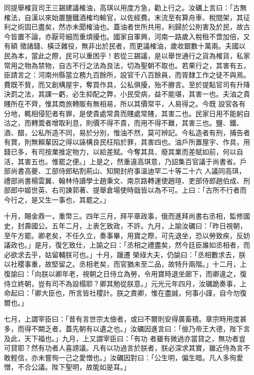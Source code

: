 \begin{pinyinscope}
 同提舉榷貨司王三錫建議榷油，高琪以用度方急，勸上行之。汝礪上言曰：「古無榷法，自漢以來始置鹽鐵酒榷均輸官，以佐經費。末流至有算舟車、稅間架，其征利之術固已盡矣，然亦未聞榷油也。蓋油者世所共用，利歸於公則害及於民，故古今皆置不論，亦厭苛細而重煩擾也。國家自軍興，河南一路歲入稅租不啻加倍，又有額
 徵諸錢、橫泛雜役，無非出於民者，而更議榷油，歲收銀數十萬兩。夫國以民為本，當此之際，民可以重困乎！若從三錫議，是以舉世通行之貨為榷貨，私家常用之物為禁物，自古不行之法為良法，切為聖朝不取也。若果行之，其害有五，臣請言之：河南州縣當立務九百餘所，設官千八百餘員，而胥隸工作之徒不與焉。費既不貲，而又創構屋宇，奪買作具，公私俱擾，殆不勝言。至於提點官司有升降決罰之法，其課一虧，必生抑配之弊，小民受病，益不能堪，其害一也。夫油之貴賤所在不齊，惟其商旅轉販有無相易，所以其價常平，人易得之。今既
 設官各有分地，輒相侵犯者有罪，是使貴處常貴而賤處常賤，其害二也。民家日用不能躬自沽之，而轉鬻者增取利息，則價不得不貴，而用不得不難，其害三也。鹽、鐵、酒、醋，公私所造不同，易於分別，惟油不然，莫可辨記。今私造者有刑，捕告者有賞，則無賴輩因之得以誣構良民枉陷於罪，其害四也。油戶所置屋宇、作具，用錢已多，有司按業推定物力，以給差賦。今奪其具、廢其業而差賦如前，何以自活，其害五也。惟罷之便。」上是之，然重違高琪意，乃詔集百官議于尚書省。戶部尚書高夔、工部侍郎粘割荊山、知開封府事溫迪罕二十等二十六
 人議同高琪，禮部尚書楊雲翼、翰林侍讀學士趙秉文、南京路轉運使趙瑄、吏部侍郎趙伯成、刑部郎中姬世英、右司諫郭著、提舉倉場使時戩皆以為不可。上曰：「古所不行者而今行之，是又生一事也，其罷之。」



 十月，賜金鼎一，重幣三。四年三月，拜平章政事，俄而進拜尚書右丞相，監修國史，封壽國公。五年二月，上表乞致政，不許。九月，上諭汝礪曰：「昨日視朝，至午方罷。卿老矣，不任久立，奏事畢，用寶之際，可先退坐，恐以勞致疾，反妨議政也。」是月，復乞致仕，上諭之曰：「丞相之禮盡矣，然今廷臣誰如丞相者，而必欲求去乎，姑留輔朕可也。」十月，躐遷
 榮祿大夫，仍諭曰：「丞相數求去，朕以社稷事重，故堅留之。丞相老矣，而官猶未至二品，故特升兩階。」十二月，上復諭曰：「向朕以卿年老，視朝之日侍立為勞，令用寶時退坐廊下，而卿違之，復侍立終朝，豈有司不為設榻耶？卿其勉從朕意。」元光元年四月，汝礪跪奏事，上命起曰：「卿大臣也，所言皆社稷計。朕之責卿，惟在盡誠，何事小謹，自今勿復爾也。」



 七月，上謂宰臣曰：「昔有言世宗太儉者，或曰不爾則安得廣畜積。章宗時用度甚多，而得不闕乏者，蓋先朝有以遺之也。」汝礪因進言曰：「儉乃帝王大德，陛下言及此，天下福也。」九月，上又謂宰臣曰：「有功
 者雖有微過亦當貸之，無功者豈可貸耶？然有功者人喜謗議。凡有以功過言於朕者，朕必深求其實，雖近侍為言不敢輕信，亦未嘗徇一己之愛憎也。」汝礪因對曰：「公生明，偏生暗。凡人多徇愛憎，不合公議。陛下聖明，故能如是耳。」




\end{pinyinscope}
